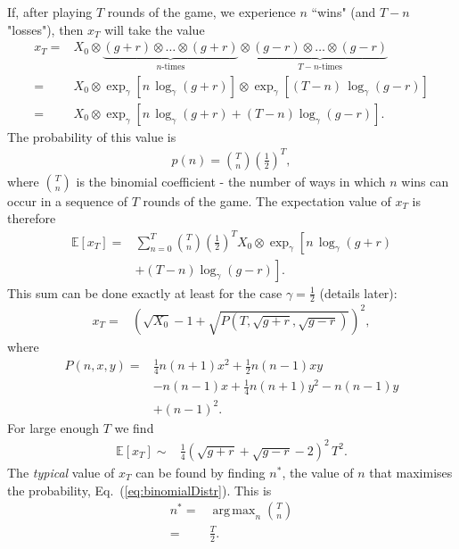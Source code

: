 \documentclass[11pt]{article}
\DeclareMathOperator*{\argmax}{arg\,max}
\begin{document}
\begin{multicols}{2}
If, after playing $T$ rounds of the game, we experience $n$ ``wins" (and $T-n$ "losses"), then $x_T$ will take the value
\begin{align*}
x_T =  &X_0\otimes \underbrace{(g+r)\otimes \ldots \otimes (g+r)}_{n\text{-times}} \otimes \underbrace{(g-r)\otimes \ldots \otimes (g-r)}_{T-n\text{-times}} \\
=& X_0\otimes\exp_\gamma\left[n\,\log_\gamma(g+r)\right] \otimes \exp_\gamma\left[(T-n)\,\log_\gamma(g-r) \right]\\
=& X_0\otimes \exp_\gamma\left[ n\,\log_\gamma(g+r) + (T-n)\log_\gamma(g-r) \right].
\end{align*}
The probability of this value is
\begin{align}
\label{eq:binomialDistr}
p(n) = {T \choose n} \left(\frac{1}{2}\right)^T,
\end{align}
where ${T \choose n}$ is the binomial coefficient -  the number of ways in which $n$ wins can occur in a sequence of $T$ rounds of the game.
The expectation value of $x_T$ is therefore
\begin{align}
\label{eq-expectationxT}\mathbb{E}\left[x_T \right] =& \sum_{n=0}^T  {T \choose n} \left(\frac{1}{2}\right)^T  X_0\otimes\exp_\gamma\left[ n\,\log_\gamma(g+r) \right.\\
\nonumber & \left. + (T-n)\log_\gamma(g-r) \right].
\end{align}
This sum can be done exactly at least for the case $\gamma = \frac{1}{2}$ (details later):
\begin{align}
x_T =& \left(\sqrt{X_0}-1 +\sqrt{P(T, \sqrt{g+r}, \sqrt{g-r})} \right)^2,
\end{align}
where
\begin{align*}
P(n, x, y) =& \frac{1}{4} n (n+1) x^2+\frac{1}{2} n (n-1) x y\\
& -n (n-1) x+\frac{1}{4} n (n+1) y^2-n (n-1) y\\
& +(n-1)^2.
\end{align*}
For large enough $T$ we find
\begin{align}
\label{eq:ExLargeT}
\mathbb{E}\left[x_T \right]  \sim & \frac{1}{4} \left( \sqrt{g+r} + \sqrt{g-r} -2\right)^2\, T^2.
\end{align}
The {\em typical} value of $x_T$ can be found by finding $n^*$,  the value of $n$ that maximises the probability, Eq.~(\ref{eq:binomialDistr}). This is
\begin{align*}
n^* =& \argmax_{n} {T \choose n}\\
=& \frac{T}{2}.
\end{align*}

\end{multicols}
\end{document}
